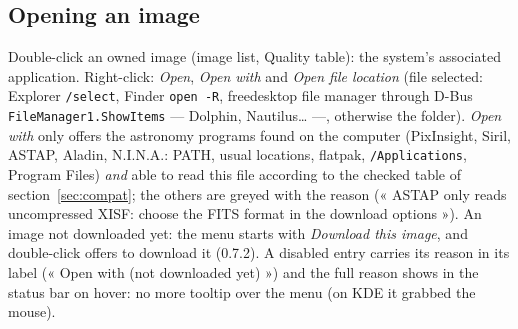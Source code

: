 \subsection{Opening an image}\label{sec:ouvrir}
Double-click an owned image (image list, Quality table): the system's associated application. Right-click:
\emph{Open}, \emph{Open with} and \emph{Open file location} (file selected: Explorer \texttt{/select}, Finder
\texttt{open -R}, freedesktop file manager through D-Bus \texttt{FileManager1.ShowItems} — Dolphin, Nautilus… —,
otherwise the folder). \emph{Open with} only offers the astronomy programs found on the computer (PixInsight, Siril,
ASTAP, Aladin, N.I.N.A.: PATH, usual locations, flatpak, \texttt{/Applications}, Program Files) \emph{and} able to
read this file according to the checked table of section~\ref{sec:compat}; the others are greyed with the reason
(« ASTAP only reads uncompressed XISF: choose the FITS format in the download options »). An image not downloaded
yet: the menu starts with \emph{Download this image}, and double-click offers to download it (0.7.2). A disabled entry
carries its reason in its label (« Open with (not downloaded yet) ») and the
full reason shows in the status bar on hover: no more tooltip over the menu (on KDE it grabbed the mouse).

